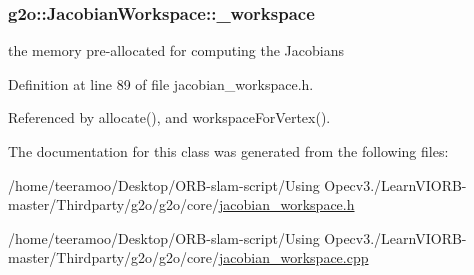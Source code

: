 \subsubsection[{\texorpdfstring{\+\_\+workspace}{_workspace}}]{ g2o\+::\+Jacobian\+Workspace\+::\+\_\+workspace\hspace{0.3cm}{\ttfamily [protected]}}\hypertarget{classg2o_1_1JacobianWorkspace_af7dbaa3a651808e1bf3f876896bd1bfc}{}\label{classg2o_1_1JacobianWorkspace_af7dbaa3a651808e1bf3f876896bd1bfc}


the memory pre-\/allocated for computing the Jacobians 



Definition at line 89 of file jacobian\+\_\+workspace.\+h.



Referenced by allocate(), and workspace\+For\+Vertex().



The documentation for this class was generated from the following files\+:\begin{DoxyCompactItemize}
\item 
/home/teeramoo/\+Desktop/\+O\+R\+B-\/slam-\/script/\+Using Opecv3./\+Learn\+V\+I\+O\+R\+B-\/master/\+Thirdparty/g2o/g2o/core/\hyperlink{jacobian__workspace_8h}{jacobian\+\_\+workspace.\+h}\item 
/home/teeramoo/\+Desktop/\+O\+R\+B-\/slam-\/script/\+Using Opecv3./\+Learn\+V\+I\+O\+R\+B-\/master/\+Thirdparty/g2o/g2o/core/\hyperlink{jacobian__workspace_8cpp}{jacobian\+\_\+workspace.\+cpp}\end{DoxyCompactItemize}
